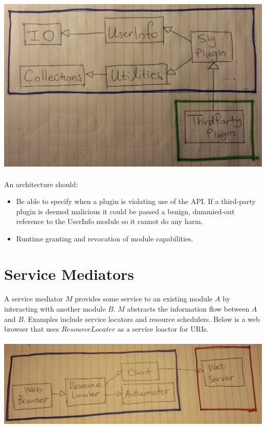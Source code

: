 \documentclass{article}
\begin{document}
\paragraph{}
\includegraphics[width=\textwidth]{plugins.jpeg}

\paragraph{}
An architecture should:
\begin{itemize}
	\item Be able to specify when a plugin is violating use of the API. If a third-party plugin is deemed malicious it could be passed a benign, dummied-out reference to the UserInfo module so it cannot do any harm.
	\item Runtime granting and revocation of module capabilities.
\end{itemize}

\section{Service Mediators}

\paragraph{}
A service mediator $M$ provides some service to an existing module $A$ by interacting with another module $B$. $M$ abstracts the information flow between $A$ and $B$. Examples include service locators and resource schedulers. Below is a web browser that uses $ResourceLocater$ as a service loactor for URIs.

\paragraph{}
\includegraphics[width=\textwidth]{service-mediator.jpeg}
\end{document}
